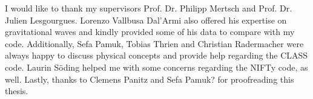 I would like to thank my supervisors Prof. Dr. Philipp Mertsch and Prof. Dr. Julien Lesgourgues. Lorenzo Vallbusa Dal'Armi also offered his expertise on gravitational waves and kindly provided some of his data to compare with my code. Additionally, Sefa Pamuk, Tobias Thrien and Christian Radermacher were always happy to discuss physical concepts and provide help regarding the CLASS code. Laurin Söding helped me with some concerns regarding the NIFTy code, as well. Lastly, thanks to Clemens Panitz and Sefa Pamuk? for proofreading this thesis.